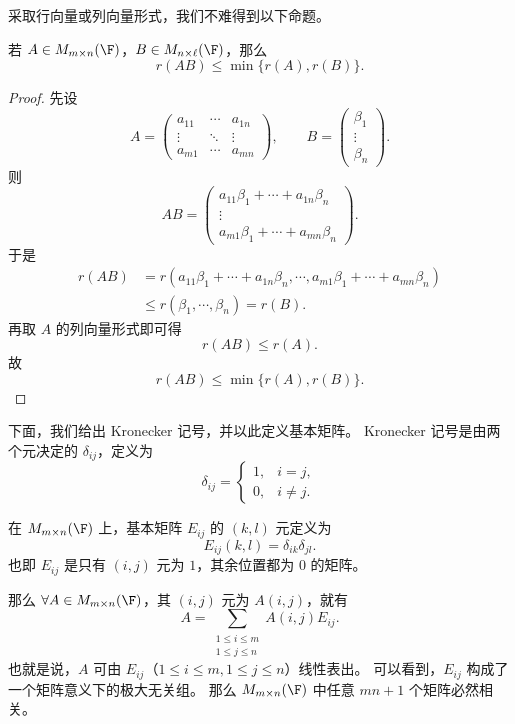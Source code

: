 采取行向量或列向量形式，我们不难得到以下命题。

\begin{proposition}
	若 $A\in M_{m\times n}(\F)$，$B\in M_{n\times \ell}(\F)$，那么
	\[
	r(AB)\leq \min\{r(A),r(B)\}.
	\]
\end{proposition}

\begin{proof}
	先设
	\[
	A=\begin{pmatrix}
		a_{11}&\cdots&a_{1n}\\
		\vdots&\ddots&\vdots\\
		a_{m1}&\cdots&a_{mn}
	\end{pmatrix},
	\qquad
	B=\begin{pmatrix}
		\beta_1\\ \vdots\\ \beta_n
	\end{pmatrix}.
	\]
	则
	\[
	AB=\begin{pmatrix}
		a_{11}\beta_1+\cdots+a_{1n}\beta_n\\
		\vdots\\
		a_{m1}\beta_1+\cdots+a_{mn}\beta_n
	\end{pmatrix}.
	\]
	于是
	\[
	\begin{aligned}
		r(AB)
		&=r(a_{11}\beta_1+
		\cdots+a_{1n}\beta_n,\cdots,
		a_{m1}\beta_1+
		\cdots+a_{mn}\beta_n)\\
		&\leq r(\beta_1,\cdots,\beta_n)=r(B).
	\end{aligned}
	\]
	再取 $A$ 的列向量形式即可得
	\[
	r(AB)\leq r(A).
	\]
	故
	\[
	r(AB)\leq \min\{r(A),r(B)\}.
	\]
\end{proof}

下面，我们给出 Kronecker 记号，并以此定义基本矩阵。
Kronecker 记号是由两个元决定的 $\delta_{ij}$，定义为
\[
\delta_{ij}=\begin{cases}
	1,&i=j,\\
	0,&i\neq j.
\end{cases}
\]

\begin{definition}[基本矩阵]
	在 $M_{m\times n}(\F)$ 上，基本矩阵 $E_{ij}$ 的 $(k,l)$ 元定义为
	\[
	E_{ij}(k,l)=\delta_{ik}\delta_{jl}.
	\]
	也即 $E_{ij}$ 是只有 $(i,j)$ 元为 $1$，其余位置都为 $0$ 的矩阵。
	

\end{definition}
	那么 $\forall A\in M_{m\times n}(\F)$，其 $(i,j)$ 元为 $A(i,j)$，就有
\[
A=\sum_{\substack{1\leq i\leq m\\1\leq j\leq n}} A(i,j)E_{ij}.\tag{1}
\]
也就是说，$A$ 可由 $E_{ij}$（$1\leq i\leq m,1\leq j\leq n$）线性表出。
可以看到，$E_{ij}$ 构成了一个矩阵意义下的极大无关组。
那么 $M_{m\times n}(\F)$ 中任意 $mn+1$ 个矩阵必然相关。

